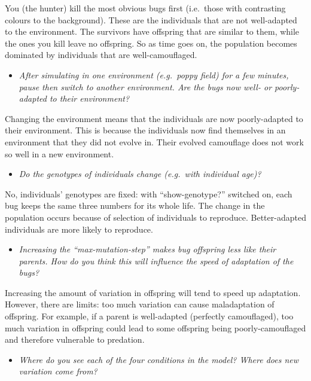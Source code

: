 \documentclass[
  a4paper]{book}
\providecommand{\tightlist}{%
  \setlength{\itemsep}{0pt}\setlength{\parskip}{0pt}}
\begin{document}
You (the hunter) kill the most obvious bugs first (i.e.~those with contrasting colours to the background). These are the individuals that are not well-adapted to the environment. The survivors have offspring that are similar to them, while the ones you kill leave no offspring. So as time goes on, the population becomes dominated by individuals that are well-camouflaged.

\begin{itemize}
\tightlist
\item
  \emph{After simulating in one environment (e.g.~poppy field) for a few minutes, pause then switch to another environment. Are the bugs now well- or poorly-adapted to their environment?}
\end{itemize}

Changing the environment means that the individuals are now poorly-adapted to their environment. This is because the individuals now find themselves in an environment that they did not evolve in. Their evolved camouflage does not work so well in a new environment.

\begin{itemize}
\tightlist
\item
  \emph{Do the genotypes of individuals change (e.g.~with individual age)?}
\end{itemize}

No, individuals' genotypes are fixed: with ``show-genotype?'' switched on, each bug keeps the same three numbers for its whole life. The change in the population occurs because of selection of individuals to reproduce. Better-adapted individuals are more likely to reproduce.

\begin{itemize}
\tightlist
\item
  \emph{Increasing the ``max-mutation-step'' makes bug offspring less like their parents. How do you think this will influence the speed of adaptation of the bugs?}
\end{itemize}

Increasing the amount of variation in offspring will tend to speed up adaptation. However, there are limits: too much variation can cause maladaptation of offspring. For example, if a parent is well-adapted (perfectly camouflaged), too much variation in offspring could lead to some offspring being poorly-camouflaged and therefore vulnerable to predation.

\begin{itemize}
\tightlist
\item
  \emph{Where do you see each of the four conditions in the model? Where does new variation come from?}
\end{itemize}
\end{document}
